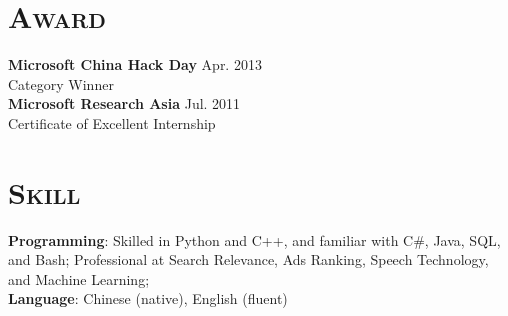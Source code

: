 \begin{resume}




\vspace*{-14pt}
\section{\textsc{Award}}
\textbf{Microsoft China Hack Day} \hfill Apr. 2013 \\
Category Winner\\
\vspace*{-6pt}
\newline
\textbf{Microsoft Research Asia} \hfill Jul. 2011 \\
Certificate of Excellent Internship\\

\vspace*{-14pt}
\section{\textsc{Skill}}
\textbf{Programming}: Skilled in Python and C++, and familiar with C\#, Java, SQL, and Bash; Professional at Search Relevance, Ads Ranking, Speech Technology, and Machine Learning;  \\
\vspace*{-8pt}
\newline
\textbf{Language}: Chinese (native), English (fluent)



\end{resume}
